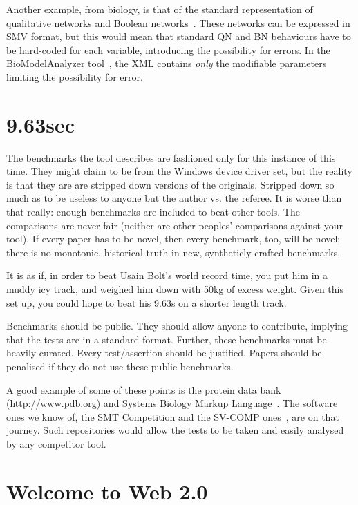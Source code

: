 \documentclass[conference]{IEEEtran}
\begin{document}
Another example, from biology, is that of the standard representation
of qualitative networks and Boolean
networks~\cite{Kauffman1969,Schaub2007}.  These networks can be
expressed in SMV format, but this would mean that standard QN and BN
behaviours have to be hard-coded for each variable, introducing the
possibility for errors. In the BioModelAnalyzer
tool~\cite{Benque2012}, the XML contains \emph{only} the modifiable
parameters limiting the possibility for error.


\section{9.63sec} 

The benchmarks the tool describes are fashioned only for this instance
of this time. They might claim to be from the Windows device driver
set, but the reality is that they are are stripped down versions of
the originals. Stripped down so much as to be useless to anyone but
the author vs. the referee. It is worse than that really: enough
benchmarks are included to beat other tools. The comparisons are never
fair (neither are other peoples' comparisons against your tool). If
every paper has to be novel, then every benchmark, too, will be novel;
there is no monotonic, historical truth in new, syntheticly-crafted
benchmarks.

It is as if, in order to beat Usain Bolt's world record time, you put
him in a muddy icy track, and weighed him down with 50kg of excess
weight. Given this set up, you could hope to beat his 9.63s on a
shorter length track.

Benchmarks should be public. They should allow anyone to contribute,
implying that the tests are in a standard format. Further, these
benchmarks must be heavily curated. Every test/assertion should be
justified. Papers should be penalised if they do not use these public
benchmarks.

A good example of some of these points is the protein data bank
(\url{http://www.pdb.org}) and Systems Biology Markup
Language~\cite{Hucka2003,Chaouiya2013}. The software ones we know of,
the SMT Competition and the SV-COMP ones~\cite{SMTComp2014,
  SVCOMP2015}, are on that journey. Such repositories would
allow the tests to be taken and easily analysed by any competitor
tool.

\section{Welcome to Web 2.0} 
\end{document}
